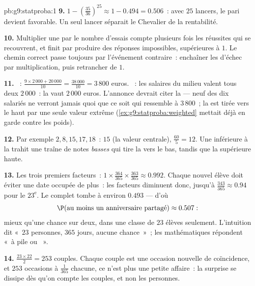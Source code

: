 \begin{solution}{pb:g9:statproba:1}
\textbf{9.} $1 - \left(\frac{35}{36}\right)^{25} \approx
1 - 0.494 = 0.506$~: avec $25$ lancers, le pari devient favorable.
Un seul lancer séparait le Chevalier de la rentabilité.

\textbf{10.} Multiplier une  par le nombre d'essais
compte plusieurs fois les réussites qui se recouvrent, et finit par
produire des réponses impossibles, supérieures à $1$. Le chemin
correct passe toujours par l'événement contraire~: enchaîner les
 d'échec par multiplication, puis retrancher de $1$.

\textbf{11.} ~: $\frac{9 \times 2\,000 + 20\,000}{10} =
\frac{38\,000}{10} = 3\,800$ euros. ~: les salaires du
milieu valent tous deux $2\,000$~: la  vaut $2\,000$ euros.
L'annonce devrait citer la  --- neuf des dix salariés ne
verront jamais quoi que ce soit qui ressemble à $3\,800$~; la
 est tirée vers le haut par une seule valeur extrême
(\cref{ex:g9:statproba:weighted} mettait déjà en garde contre les
poids).

\textbf{12.} Par exemple $2, 8, 15, 17, 18$~:  $15$ (la
valeur centrale),  $\frac{60}{5} = 12$. Une 
inférieure à la  trahit une traîne de notes \emph{basses} qui
tire la  vers le bas, tandis que la  supérieure 
haute.

\textbf{13.} Les trois premiers facteurs~:
$1 \times \frac{364}{365} \times \frac{363}{365} \approx 0.992$.
Chaque nouvel élève doit éviter une date occupée de plus~: les
facteurs diminuent donc, jusqu'à
$\frac{343}{365} \approx 0.94$ pour le $23^\text{e}$. Le 
complet tombe à environ $0.493$ --- d'où
\[
\P(\text{au moins un anniversaire partagé}) \approx 0.507 :
\]
mieux qu'une chance sur deux, dans une classe de $23$ élèves
seulement. L'intuition dit «~$23$ personnes, $365$ jours, aucune
chance~»~; les mathématiques répondent «~à pile ou ~».

\textbf{14.} $\frac{23 \times 22}{2} = 253$ couples. Chaque couple
est une occasion nouvelle de coïncidence, et $253$ occasions à
$\frac{1}{365}$ chacune, ce n'est plus une petite affaire~: la
surprise se dissipe dès qu'on compte les couples, et non les
personnes.


\end{solution}
